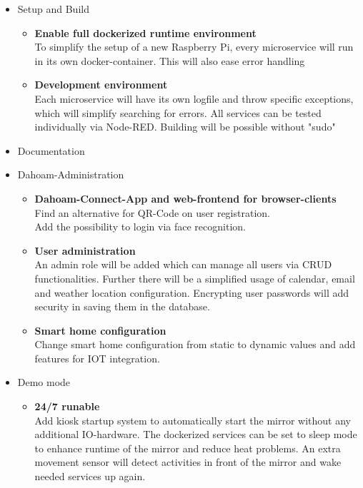 \documentclass[12pt]{article}
\theoremstyle{definition}
\begin{document}
\begin{itemize}
    \item Setup and Build
    \begin{itemize}
        \item \textbf{Enable full dockerized runtime environment} \\
         To simplify the setup of a new Raspberry Pi, every microservice will run in its own docker-container. This will also ease error handling
        \item \textbf{Development environment} \\
        Each microservice will have its own logfile and throw specific exceptions, which will simplify searching for errors.
        All services can be tested individually via Node-RED.
        Building will be possible without "sudo"
    \end{itemize}
    \item Documentation
    \item Dahoam-Administration
    \begin{itemize}
        \item \textbf{Dahoam-Connect-App and web-frontend for browser-clients} \\
        Find an alternative for QR-Code on user registration. \\
        Add the possibility to login via face recognition.
        \item \textbf{User administration} \\
        An admin role will be added which can manage all users via CRUD functionalities. Further there will be a simplified usage of calendar, email and weather location configuration. Encrypting user passwords will add security in saving them in the database.
        \item \textbf{Smart home configuration} \\
        Change smart home configuration from static to dynamic values and add features for IOT integration.
    \end{itemize}
    \item Demo mode 
    \begin{itemize}  \\
    \item \textbf{24/7 runable}\\
        Add kiosk startup system to automatically start the mirror without any additional IO-hardware. The dockerized services can be set to sleep mode to enhance runtime of the mirror and reduce heat problems. An extra movement sensor will detect activities in front of the mirror and wake needed services up again.

\end{itemize}
\end{itemize}
\end{document}
